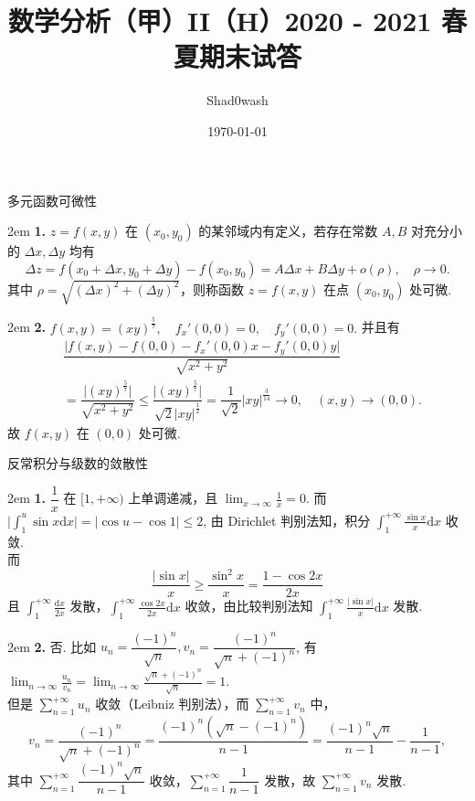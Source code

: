 \documentclass[UTF8,14pt,normal]{ctexart}
\title{数学分析（甲）II（H）2020 - 2021 春夏期末试答}
\author{Shad0wash}
\date{\today}
\begin{document}
\maketitle

多元函数可微性

    \hangindent 2em
    \noindent
    \textbf{1.} \(z = f(x, y)\) 在 \((x_0, y_0)\) 的某邻域内有定义，若存在常数 \(A, B\) 对充分小的 \(\Delta x, \Delta y\) 均有
    \[
        \Delta z = f(x_0 + \Delta x, y_0 + \Delta y) - f(x_0, y_0) = A \Delta x + B \Delta y + o(\rho), \quad \rho \rightarrow 0.
    \]
    其中 \(\rho = \sqrt{(\Delta x)^2 + (\Delta y)^2}\)，则称函数 \(z = f(x, y)\) 在点 \((x_0, y_0)\) 处可微.

    \hangindent 2em
    \noindent
    \textbf{2.} \(f(x, y) = (xy)^{\frac{5}{7}}, \quad f_x'(0, 0) = 0, \quad f_y'(0, 0) = 0.\) 并且有
    \begin{align*}
        & \dfrac{\lvert f(x, y) - f(0, 0) - f_x'(0, 0)x - f_y'(0, 0)y \rvert}{\sqrt{x^2 + y^2}} \\ & = \dfrac{\lvert (xy)^{\frac{5}{7}} \rvert}{\sqrt{x^2 + y^2}} \leqslant \dfrac{\lvert (xy)^{\frac{5}{7}} \rvert}{\sqrt{2} \lvert xy \rvert^{\frac{1}{2}}} = \dfrac{1}{\sqrt{2}} \lvert xy \rvert^{\frac{3}{14}} \rightarrow 0, \quad (x, y) \rightarrow (0, 0).
    \end{align*}
    故 \(f(x, y)\) 在 \((0, 0)\) 处可微.

反常积分与级数的敛散性
    
    \hangindent 2em
    \noindent
    \textbf{1.} \(\dfrac{1}{x}\) 在 \([1, +\infty)\) 上单调递减，且 \(\lim_{x \to \infty} \frac{1}{x} = 0\). 而 \(\lvert \int_1^u \sin x \mathrm{d}x \rvert = \lvert \cos u - \cos 1 \rvert \leqslant 2\), 由 Dirichlet 判别法知，积分 \(\int_1^{+\infty} \frac{\sin x}{x} \mathrm{d}x\) 收敛. \\
    而 
    \[
        \dfrac{\lvert \sin x \rvert}{x} \geqslant \dfrac{\sin^2 x}{x} = \dfrac{1 - \cos 2x}{2x} 
    \]
    且 \(\int_1^{+\infty} \frac{\mathrm{d} x}{2x}\) 发散，\(\int_1^{+\infty} \frac{\cos 2x}{2x} \mathrm{d}x\) 收敛，由比较判别法知 \(\int_1^{+\infty} \frac{\lvert \sin x \rvert}{x} \mathrm{d}x\) 发散.

    \hangindent 2em
    \noindent
    \textbf{2.} 否. 比如 \(u_n = \dfrac{(-1)^n}{\sqrt{n}}, v_n = \dfrac{(-1)^n}{\sqrt{n} + (-1)^n}\), 有 \(\lim_{n \to \infty} \frac{u_n}{v_n} = \lim_{n \to \infty} \frac{\sqrt{n} + (-1)^n}{\sqrt{n}} = 1\). \\ 但是 \(\sum_{n = 1}^{+\infty} u_n\) 收敛（Leibniz 判别法），而 \(\sum_{n = 1}^{+\infty} v_n\) 中，
    \[
        v_n = \dfrac{(-1)^n}{\sqrt{n} + (-1)^n} = \dfrac{(-1)^n(\sqrt{n} - (-1)^n)}{n - 1} = \dfrac{(-1)^n\sqrt{n}}{n - 1} - \dfrac{1}{n - 1},
    \]
    其中 \(\sum_{n = 1}^{+\infty} \dfrac{(-1)^n\sqrt{n}}{n - 1}\) 收敛，\(\sum_{n = 1}^{+\infty} \dfrac{1}{n - 1}\) 发散，故 \(\sum_{n = 1}^{+\infty} v_n\) 发散.
\end{document}
